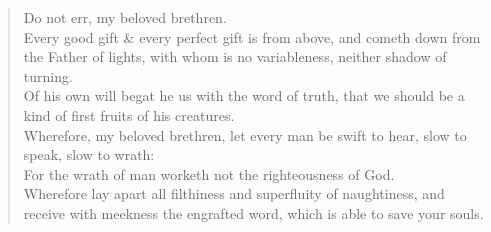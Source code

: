 \documentclass[MAIN]{subfiles}
\begin{document}
\begin{verse}
Do not err, my beloved brethren.\\
Every good gift \& every perfect gift is from above, and cometh down from the Father of lights, with whom is no variableness, neither shadow of turning.\\
Of his own will begat he us with the word of truth, that we should be a kind of first fruits of his creatures.\\
Wherefore, my beloved brethren, let every man be swift to hear, slow to speak, slow to wrath:\\
For the wrath of man worketh not the righteousness of God.\\
Wherefore lay apart all filthiness and superfluity of naughtiness, and receive with meekness the engrafted word, which is able to save your souls.
\end{verse}
\end{document}

